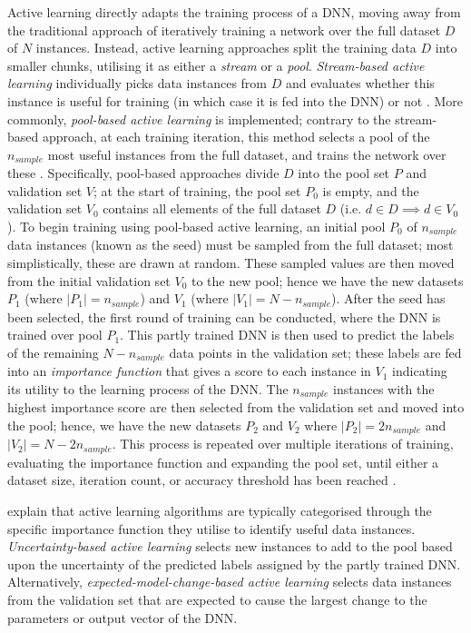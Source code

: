 \documentclass[a4paper, 11pt]{report}
\begin{document}
    Active learning directly adapts the training process of a DNN, moving away from the traditional approach of iteratively training a network over the full dataset $D$ of $N$ instances. Instead, active learning approaches split the training data $D$ into smaller chunks, utilising it as either a \emph{stream} or a \emph{pool}. \emph{Stream-based active learning} individually picks data instances from $D$ and evaluates whether this instance is useful for training (in which case it is fed into the DNN) or not \citep{ren-2021}. More commonly, \emph{pool-based active learning} is implemented; contrary to the stream-based approach, at each training iteration, this method selects a pool of the $n_{sample}$ most useful instances from the full dataset, and trains the network over these \citep{ren-2021}. Specifically, pool-based approaches divide $D$ into the pool set $P$ and validation set $V$; at the start of training, the pool set $P_0$ is empty, and the validation set $V_0$ contains all elements of the full dataset $D$ (i.e. $d \in D \implies d \in V_0$). To begin training using pool-based active learning, an initial pool $P_0$ of $n_{sample}$ data instances (known as the seed) must be sampled from the full dataset; most simplistically, these are drawn at random. These sampled values are then moved from the initial validation set $V_0$ to the new pool; hence we have the new datasets $P_1$ (where $\vert P_1 \vert = n_{sample}$) and $V_1$ (where $\vert V_1 \vert = N - n_{sample}$). After the seed has been selected, the first round of training can be conducted, where the DNN is trained over pool $P_1$. This partly trained DNN is then used to predict the labels of the remaining $N - n_{sample}$ data points in the validation set; these labels are fed into an \emph{importance function} that gives a score to each instance in $V_1$ indicating its utility to the learning process of the DNN. The $n_{sample}$ instances with the highest importance score are then selected from the validation set and moved into the pool; hence, we have the new datasets $P_2$ and $V_2$ where $\vert P_2 \vert = 2 n_{sample}$ and $\vert V_2 \vert = N - 2 n_{sample}$. This process is repeated over multiple iterations of training, evaluating the importance function and expanding the pool set, until either a dataset size, iteration count, or accuracy threshold has been reached \citep{ren-2021}. 

    \citet{xu-2021} explain that active learning algorithms are typically categorised through the specific importance function they utilise to identify useful data instances. \emph{Uncertainty-based active learning} selects new instances to add to the pool based upon the uncertainty of the predicted labels assigned by the partly trained DNN. Alternatively, \emph{expected-model-change-based active learning} selects data instances from the validation set that are expected to cause the largest change to the parameters or output vector of the DNN. 
\end{document}
